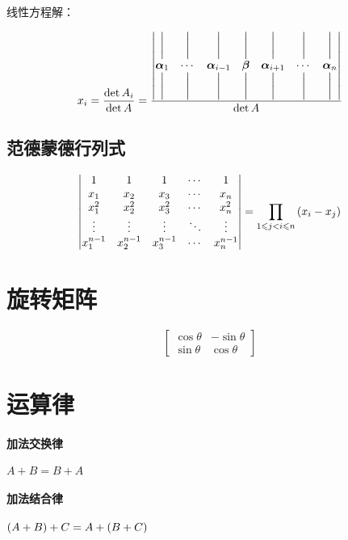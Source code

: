 \documentclass{article}
\begin{document}
线性方程解：

\[\def\av{\boldsymbol{\mathrm\alpha}}
    \def\bv{\boldsymbol{\mathrm\beta}}
    x_i=\frac{\det A_i}{\det A}=\frac{
        \begin{vmatrix}
            \bigg| & \bigg| & \bigg|    & \bigg| & \bigg|    & \bigg| & \bigg| \\
            \av_1  & \cdots & \av_{i-1} & \bv    & \av_{i+1} & \cdots & \av_n  \\
            \bigg| & \bigg| & \bigg|    & \bigg| & \bigg|    & \bigg| & \bigg|
        \end{vmatrix}}{\det A}\]

\subsection{范德蒙德行列式}

\[\begin{vmatrix}
        1         & 1         & 1         & \cdots & 1         \\
        x_1       & x_2       & x_3       & \cdots & x_n       \\
        x_1^2     & x_2^2     & x_3^2     & \cdots & x_n^2     \\
        \vdots    & \vdots    & \vdots    & \ddots & \vdots    \\
        x_1^{n-1} & x_2^{n-1} & x_3^{n-1} & \cdots & x_n^{n-1} \\
    \end{vmatrix}
    =\prod_{1\leqslant j<i\leqslant n}\left(x_i-x_j\right)\]

\section{旋转矩阵}

\[\begin{bmatrix}
        \cos\theta & -\sin\theta \\
        \sin\theta & \cos\theta
    \end{bmatrix}\]

\section{运算律}

\paragraph{加法交换律}$A+B=B+A$

\paragraph{加法结合律}$\left(A+B\right)+C=A+\left(B+C\right)$
\end{document}
